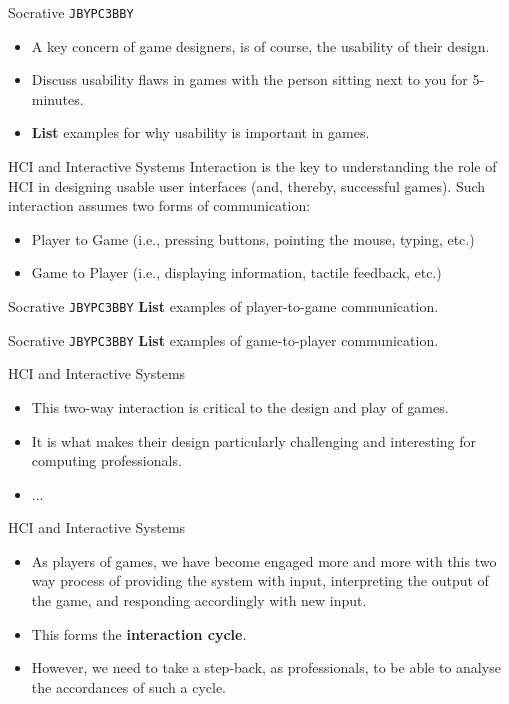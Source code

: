 \begin{frame}[fragile]{Socrative \texttt{JBYPC3BBY}}
	\begin{itemize}
		\item A key concern of game designers, is of course, the usability of their design. 
		\item Discuss usability flaws in games with the person sitting next to you for 5-minutes.
		\item \textbf{List} examples for why usability is important in games.
	\end{itemize}
\end{frame}

\begin{frame}{HCI and Interactive Systems}
	Interaction is the key to understanding the role of HCI in designing usable user interfaces (and, thereby, successful games). 
	Such interaction assumes two forms of communication:
	
	\begin{itemize}
		\item Player to Game (i.e., pressing buttons, pointing the mouse, typing, etc.)
		\item Game to Player (i.e., displaying information, tactile feedback, etc.)
	\end{itemize}
\end{frame}

\begin{frame}[fragile]{Socrative \texttt{JBYPC3BBY}}
    \textbf{List} examples of player-to-game communication.
\end{frame}

\begin{frame}[fragile]{Socrative \texttt{JBYPC3BBY}}
    \textbf{List} examples of game-to-player communication.
\end{frame}

\begin{frame}{HCI and Interactive Systems}
	\begin{itemize}
		\item This two-way interaction is critical to the design and play of games.
		\item  It is what makes their design particularly challenging and interesting for computing professionals. 
		\item ...
	\end{itemize}
\end{frame}

\begin{frame}{HCI and Interactive Systems}
	\begin{itemize}
		\item As players of games, we have become engaged more and more with this two way process of providing
		the system with input, interpreting the output of the game, and responding accordingly with new input.
		\item This forms the \textbf{interaction cycle}.
		\item However, we need to take a step-back, as professionals, to be able to analyse the accordances of such a cycle.
	\end{itemize}
\end{frame}

